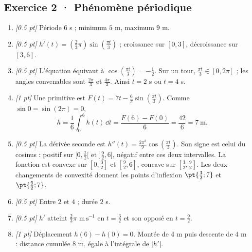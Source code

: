 \subsection*{Exercice 2 · Phénomène périodique}\begin{enumerate}

\item \textit{[\num{0,5} pt]} Période $6$ s ; minimum $5$ m, maximum $9$ m.

\item \textit{[\num{0,5} pt]} $h'(t)=(\frac{2}{3}\pi)\sin (\frac{\pi t}{3})$ ; croissance sur $[0,3]$, décroissance sur $[3,6]$.

\item \textit{[\num{0,5} pt]} L'équation équivaut à $\cos (\frac{\pi t}{3})=-\frac{1}{2}$. Sur un tour, $\frac{\pi t}{3}\in[0,2\pi]$ ; les angles convenables sont $\frac{2\pi}{3}$ et $\frac{4\pi}{3}$. Ainsi $t=2$ s ou $t=4$ s.

\item \textit{[1 pt]} Une primitive est $F(t)=7t-\frac{6}{\pi}\sin (\frac{\pi t}{3})$. Comme $\sin0=\sin(2\pi)=0$,
\[\overline h=\frac{1}{6}\int_0^{6}h(t)\,\dd t=\frac{F(6)-F(0)}{6}=\frac{42}{6}=7\ \mathrm{m}.\]

\item \textit{[\num{0,5} pt]} La dérivée seconde est $h''(t)=\frac{2\pi^2}{9}\cos (\frac{\pi t}{3})$. Son signe est celui du cosinus : positif sur $[0,\frac{3}{2}[$ et $]\frac{9}{2},6]$, négatif entre ces deux intervalles. La fonction est convexe sur $[0,\frac{3}{2}]$ et $[\frac{9}{2},6]$, concave sur $[\frac{3}{2},\frac{9}{2}]$. Les deux changements de convexité donnent les points d'inflexion $\pt{\frac{3}{2};7}$ et $\pt{\frac{9}{2};7}$.

\item \textit{[\num{0,5} pt]} Entre $2$ et $4$ ; durée $2$ s.

\item \textit{[\num{0,5} pt]} $h'$ atteint $\frac{2}{3}\pi$ $\mathrm{m\,s^{-1}}$ en $t=\frac{3}{2}$ et son opposé en $t=\frac{9}{2}$.

\item \textit{[1 pt]} Déplacement $h(6)-h(0)=0$. Montée de $4$ m puis descente de $4$ m : distance cumulée $8$ m, égale à l'intégrale de $|h'|$.

\end{enumerate}

